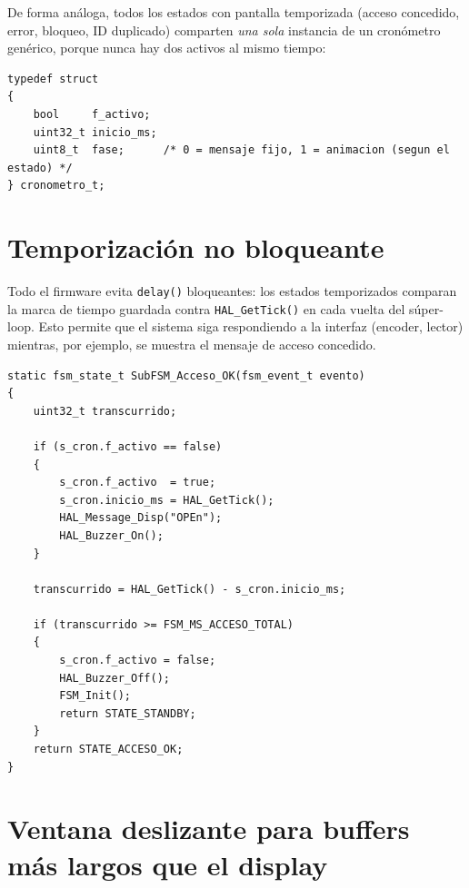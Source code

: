 \documentclass[11pt,a4paper]{article}
\begin{document}
De forma análoga, todos los estados con pantalla temporizada (acceso
concedido, error, bloqueo, ID duplicado) comparten \emph{una sola}
instancia de un cronómetro genérico, porque nunca hay dos activos al mismo
tiempo:

\begin{lstlisting}[caption={Cronómetro genérico reutilizado por todos los estados temporizados.}, label={lst:cronometro}]
typedef struct
{
    bool     f_activo;
    uint32_t inicio_ms;
    uint8_t  fase;      /* 0 = mensaje fijo, 1 = animacion (segun el estado) */
} cronometro_t;
\end{lstlisting}


\section{Temporización no bloqueante}

Todo el firmware evita \lstinline{delay()} bloqueantes: los estados
temporizados comparan la marca de tiempo guardada contra
\lstinline{HAL_GetTick()} en cada vuelta del súper-loop. Esto permite que
el sistema siga respondiendo a la interfaz (encoder, lector) mientras, por
ejemplo, se muestra el mensaje de acceso concedido.

\begin{lstlisting}[caption={Patrón de temporización no bloqueante en \texttt{SubFSM\_Acceso\_OK()}.}, label={lst:accesook}]
static fsm_state_t SubFSM_Acceso_OK(fsm_event_t evento)
{
    uint32_t transcurrido;

    if (s_cron.f_activo == false)
    {
        s_cron.f_activo  = true;
        s_cron.inicio_ms = HAL_GetTick();
        HAL_Message_Disp("OPEn");
        HAL_Buzzer_On();
    }

    transcurrido = HAL_GetTick() - s_cron.inicio_ms;

    if (transcurrido >= FSM_MS_ACCESO_TOTAL)
    {
        s_cron.f_activo = false;
        HAL_Buzzer_Off();
        FSM_Init();
        return STATE_STANDBY;
    }
    return STATE_ACCESO_OK;
}
\end{lstlisting}


\section{Ventana deslizante para buffers más largos que el display}
\end{document}
